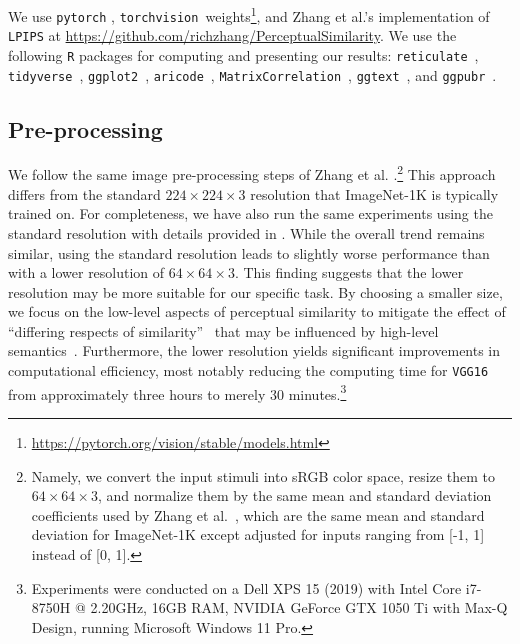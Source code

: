 \documentclass[sigconf]{acmart}
\begin{document}
We use \texttt{pytorch} \cite{paszke2019pytorch}, \texttt{torchvision }weights\footnote{\url{https://pytorch.org/vision/stable/models.html}}, and Zhang et al.'s implementation of \texttt{LPIPS} \cite{zhangUnreasonableEffectivenessDeep2018} at \url{https://github.com/richzhang/PerceptualSimilarity}. We use the following \texttt{R} packages for computing and presenting our results: \texttt{reticulate}~\cite{ushey}, \texttt{tidyverse}~\cite{wickham2019welcome}, \texttt{ggplot2}~\cite{wickham2011ggplot2}, \texttt{aricode}~\cite{chiquet2020package}, \texttt{MatrixCorrelation}~\cite{matrixcorrelation}, \texttt{ggtext}~\cite{wilke2020ggtext}, and \texttt{ggpubr}~\cite{ggpubr}. 

\subsection{Pre-processing}

We follow the same image pre-processing steps of Zhang et al. \cite{zhangUnreasonableEffectivenessDeep2018}.\footnote{Namely, we convert the input stimuli into sRGB color space, resize them to $64 \times 64 \times 3$, and normalize them by the same mean and standard deviation coefficients used by Zhang et al.~\cite{zhangUnreasonableEffectivenessDeep2018}, which are the same mean and standard deviation for ImageNet-1K except adjusted for inputs ranging from [-1, 1] instead of [0, 1].} This approach differs from the standard $224 \times 224 \times 3$ resolution that ImageNet-1K is typically trained on. For completeness, we have also run the same experiments using the standard resolution with details provided in . While the overall trend remains similar, using the standard resolution leads to slightly worse performance than with a lower resolution of $64 \times 64 \times 3$. This finding suggests that the lower resolution may be more suitable for our specific task. By choosing a smaller size, we focus on the low-level aspects of perceptual similarity to mitigate the effect of ``differing respects of similarity''~\cite{medinRespectsSimilarity1993} that may be influenced by high-level semantics~\cite{zhangUnreasonableEffectivenessDeep2018}. Furthermore, the lower resolution yields significant improvements in computational efficiency, most notably reducing the computing time for \texttt{VGG16} from approximately three hours to merely 30 minutes.\footnote{Experiments were conducted on a Dell XPS 15 (2019) with Intel Core i7-8750H @ 2.20GHz, 16GB RAM, NVIDIA GeForce GTX 1050 Ti with Max-Q Design, running Microsoft Windows 11 Pro.} 
\end{document}
